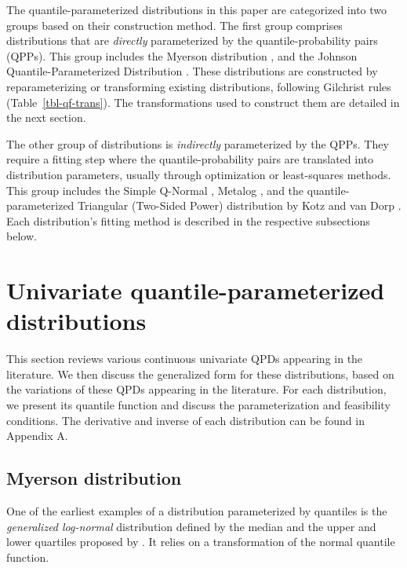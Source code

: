\documentclass[
  fleqn,
  deca,
  blindrev
]{informs4}
\begin{document}
The quantile-parameterized distributions in this paper are categorized
into two groups based on their construction method. The first group
comprises distributions that are \emph{directly} parameterized by the
quantile-probability pairs (QPPs). This group includes the Myerson
distribution \citep{myerson2005ProbabilityModelsEconomic}, and the
Johnson Quantile-Parameterized Distribution
\citep{hadlock2017JohnsonQuantileParameterizedDistributions, hadlock2019GeneralizedJohnsonQuantileParameterized}.
These distributions are constructed by reparameterizing or transforming
existing distributions, following Gilchrist rules
(Table~\ref{tbl-qf-trans}). The transformations used to construct them
are detailed in the next section.

The other group of distributions is \emph{indirectly} parameterized by
the QPPs. They require a fitting step where the quantile-probability
pairs are translated into distribution parameters, usually through
optimization or least-squares methods. This group includes the Simple
Q-Normal \citep{keelin2011QuantileParameterizedDistributions}, Metalog
\citep{keelin2016MetalogDistributions}, and the quantile-parameterized
Triangular (Two-Sided Power) distribution by Kotz and van Dorp
\citep{kotz2004BetaOtherContinuous}. Each distribution's fitting method
is described in the respective subsections below.

\section{Univariate quantile-parameterized
distributions}\label{univariate-quantile-parameterized-distributions}

This section reviews various continuous univariate QPDs appearing in the
literature. We then discuss the generalized form for these
distributions, based on the variations of these QPDs appearing in the
literature. For each distribution, we present its quantile function and
discuss the parameterization and feasibility conditions. The derivative
and inverse of each distribution can be found in Appendix A.

\subsection{Myerson distribution}\label{myerson-distribution}

One of the earliest examples of a distribution parameterized by
quantiles is the \emph{generalized log-normal} distribution defined by
the median and the upper and lower quartiles proposed by
\citep{myerson2005ProbabilityModelsEconomic}. It relies on a
transformation of the normal quantile function.
\end{document}
